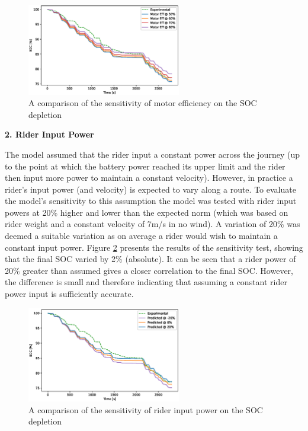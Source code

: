 \documentclass[a4paper, 10pt]{article}
\numberwithin{equation}{section}
\begin{document}
\begin{figure}[H]
    \centering
    \includegraphics[width=0.6\textwidth]{images/SA_motor_eff.eps}
    \caption{A comparison of the sensitivity of motor efficiency on the SOC depletion}
    \label{fig:SA_motor_eff}
\end{figure}

\textbf{2. Rider Input Power}

The model assumed that the rider input a constant power across the journey (up to the point at which the battery power reached its upper limit and the rider then input more power to maintain a constant velocity). However, in practice a rider's input power (and velocity) is expected to vary along a route. To evaluate the model's sensitivity to this assumption the model was tested with rider input powers at 20\% higher and lower than the expected norm (which was based on rider weight and a constant velocity of 7m/s in no wind). A variation of 20\% was deemed a suitable variation as on average a rider would wish to maintain a constant input power. Figure \ref{fig:SA_rider_p} presents the results of the sensitivity test, showing that the final SOC varied by 2\% (absolute). It can be seen that a rider power of 20\% greater than assumed gives a closer correlation to the final SOC. However, the difference is small and therefore indicating that assuming a constant rider power input is sufficiently accurate.

\begin{figure}[H]
    \centering
    \includegraphics[width=0.6\textwidth]{images/SA_rider_p.eps}
    \caption{A comparison of the sensitivity of rider input power on the SOC depletion}
    \label{fig:SA_rider_p}
\end{figure}
\end{document}
